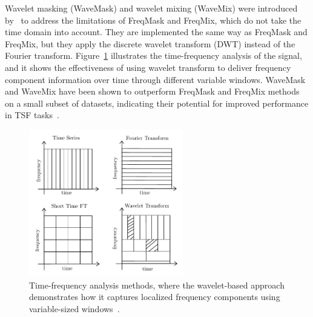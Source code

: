 Wavelet masking (WaveMask) and wavelet mixing (WaveMix) were introduced by~\cite{arabi2024wavemaskmixexploringwaveletbasedaugmentations} to address the limitations of FreqMask and FreqMix, which do not take the time domain into account. They are implemented the same way as FreqMask and FreqMix, but they apply the discrete wavelet transform (DWT) instead of the Fourier transform. Figure~\ref{fig:wavemask} illustrates the time-frequency analysis of the signal, and it shows the effectiveness of using wavelet transform to deliver frequency component information over time through different variable windows. WaveMask and WaveMix have been shown to outperform FreqMask and FreqMix methods on a small subset of datasets, indicating their potential for improved performance in TSF tasks~\cite{arabi2024wavemaskmixexploringwaveletbasedaugmentations}.






\begin{figure}[h!]
    \centering
    \includegraphics[page=1, width=0.6\textwidth]{./images/wavemask.pdf}
\caption{Time-frequency analysis methods, where the wavelet-based approach demonstrates how it captures localized frequency components using variable-sized windows~\cite{en16020764, arabi2024wavemaskmixexploringwaveletbasedaugmentations}.}
    \label{fig:wavemask}
\end{figure}






